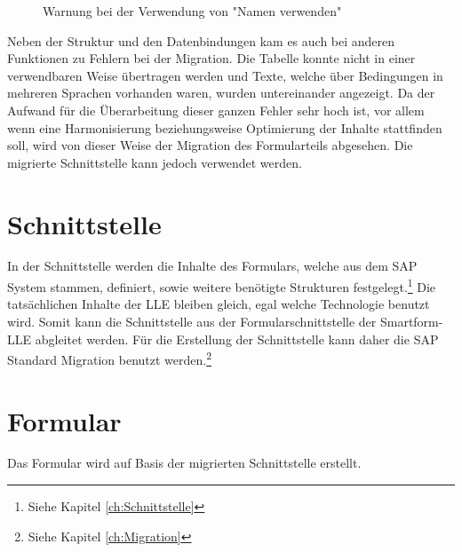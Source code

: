 \begin{figure}[ht]
	\centering
	\caption{Warnung bei der Verwendung von "Namen verwenden"}
	\label{Namen-Fehler}
\end{figure}

Neben der Struktur und den Datenbindungen kam es auch bei anderen Funktionen zu Fehlern bei der Migration. Die Tabelle konnte nicht in einer verwendbaren Weise übertragen werden und Texte, welche über Bedingungen in mehreren Sprachen vorhanden waren, wurden untereinander angezeigt. Da der Aufwand für die Überarbeitung dieser ganzen Fehler sehr hoch ist, vor allem wenn eine Harmonisierung beziehungsweise Optimierung der Inhalte stattfinden soll, wird von dieser Weise der Migration des Formularteils abgesehen. Die migrierte Schnittstelle kann jedoch verwendet werden. 

\section{Schnittstelle}

In der Schnittstelle werden die Inhalte des Formulars, welche aus dem SAP System stammen, definiert, sowie weitere benötigte Strukturen festgelegt.\footnote{Siehe Kapitel \ref{ch:Schnittstelle}}
Die tatsächlichen Inhalte der \ac{LLE} bleiben gleich, egal welche Technologie benutzt wird. Somit kann die Schnittstelle aus der Formularschnittstelle der Smartform-\ac{LLE} abgleitet werden. Für die Erstellung der Schnittstelle kann daher die SAP Standard Migration benutzt werden.\footnote{Siehe Kapitel \ref{ch:Migration}}


\section{Formular}



Das Formular wird auf Basis der migrierten Schnittstelle erstellt. 

